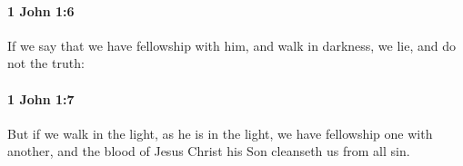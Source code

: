 		\paragraph{1 John 1:6} %
			\label{1JOHN-1-6}

			If we say that we have fellowship with him, and walk in darkness, we lie, and do not the truth:

			\begin{framed}
			\scriptsize
				\begin{compactdesc}
					\item[SBLG] 
				\end{compactdesc}
			\end{framed}

		\paragraph{1 John 1:7} %
			\label{1JOHN-1-7}

			But if we walk in the light, as he is in the light, we have fellowship one with another, and the blood of Jesus Christ his Son cleanseth us from all sin.

